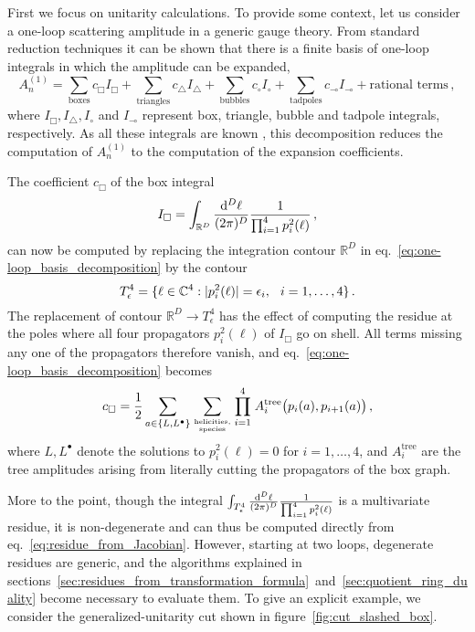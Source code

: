 \documentclass[dvipsnames,preprint,12pt,sort&compress]{elsarticle}
\def\d{{\rm d}}
\begin{document}
First we focus on unitarity calculations. To provide some context, let us
consider a one-loop scattering amplitude in a generic gauge theory. From standard
reduction techniques it can be shown that there is a finite basis of one-loop
integrals in which the amplitude can be expanded,
\begin{equation}
A^{(1)}_n = \sum_{\mathrm{boxes}} c_\Box I_\Box
+ \sum_{\mathrm{triangles}} c_\triangle I_\triangle
+ \sum_{\mathrm{bubbles}} c_\circ I_\circ
+ \sum_{\mathrm{tadpoles}} c_\multimap I_\multimap +
\mbox{rational terms}\,, \label{eq:one-loop_basis_decomposition}
\end{equation}
where $I_\Box, I_\triangle, I_\circ$ and $I_\multimap$ represent
box, triangle, bubble and tadpole integrals, respectively. As all these integrals
are known \cite{Bern:1994cg}, this decomposition reduces the computation of $A^{(1)}_n$
to the computation of the expansion coefficients.

The coefficient $c_\Box$ of the box integral
\begin{equation}
I_\Box = \int_{\mathbb{R}^D} \frac{\d^D \ell}{(2\pi)^D}
\frac{1}{\prod_{i=1}^4 p_i^2 (\ell)} \,,
\end{equation}
can now be computed by replacing the integration contour $\mathbb{R}^D$ in
eq.~\eqref{eq:one-loop_basis_decomposition} by the contour
\begin{equation}
T^4_\epsilon = \{  \ell \in \mathbb{C}^4 : |p^2_i(\ell)|=\epsilon_i, \hspace{2.5mm} i=1,\ldots, 4 \} \, .
\label{eq:quad_cut_torus_formal}
\end{equation}
The replacement of contour $\mathbb{R}^D \to T^4_\epsilon$ has the
effect of computing the residue at the poles where all four propagators
$p_i^2(\ell)$ of $I_\Box$ go on shell. All terms missing
any one of the propagators therefore vanish, and eq.~\eqref{eq:one-loop_basis_decomposition}
becomes~\cite{Britto:2004nc}
\begin{equation}
c_\Box = \frac{1}{2}
\sum_{a\in \{ L,L^\bullet\}} \sum_{{\mathrm{helicities,}\atop \mathrm{species}}}
\prod_{i=1}^4 \hspace{0.4mm} A^\mathrm{tree}_i \big(p_i (a), p_{i+1} (a) \big) \,,
\label{eq:BCF_box_formula}
\end{equation}
where $L,L^\bullet$ denote the solutions to $p_i^2(\ell)=0$ for $i=1,\ldots,4$,
and $A^\mathrm{tree}_i$ are the tree amplitudes arising from literally cutting the
propagators of the box graph.

More to the point, though the integral $\int_{T^4_\epsilon} \frac{\d^D \ell}{(2\pi)^D}
\frac{1}{\prod_{i=1}^4 p_i^2 (\ell)}$ is a multivariate residue, it is non-degenerate
and can thus be computed directly from eq.~\eqref{eq:residue_from_Jacobian}.
However, starting at two loops, degenerate residues are generic, and the algorithms explained in
sections~\ref{sec:residues_from_transformation_formula}~and~\ref{sec:quotient_ring_duality}
become necessary to evaluate them. To give an explicit example, we consider the
generalized-unitarity cut shown in figure~\ref{fig:cut_slashed_box}.
\end{document}
